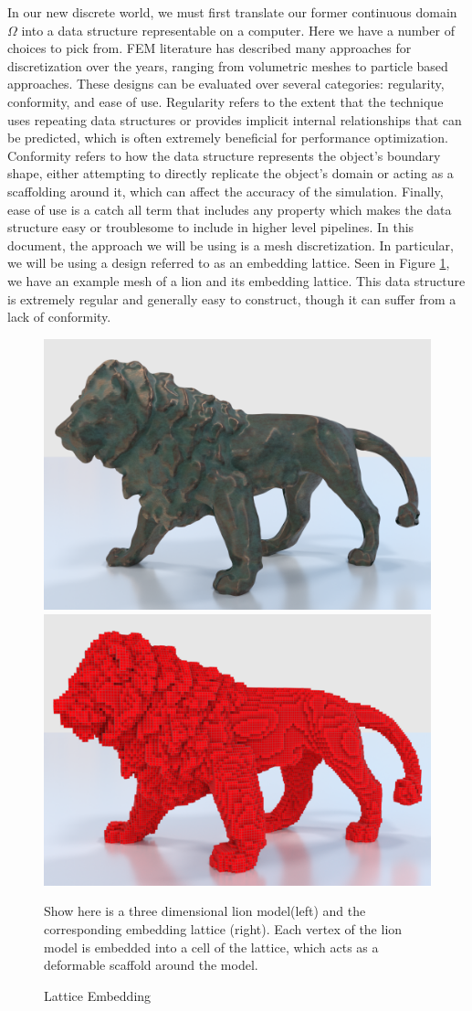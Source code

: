 In our new discrete world, we must first translate our former
continuous domain $\Omega$ into a data structure representable on a
computer. Here we have a number of choices to pick from. FEM
literature has described many approaches for discretization over the
years, ranging from volumetric meshes to particle based
approaches. These designs can be evaluated over several categories:
regularity, conformity, and ease of use. Regularity refers to the
extent that the technique uses repeating data structures or provides
implicit internal relationships that can be predicted, which is often
extremely beneficial for performance optimization. Conformity refers
to how the data structure represents the object's boundary shape,
either attempting to directly replicate the object's domain or acting
as a scaffolding around it, which can affect the accuracy of the
simulation. Finally, ease of use is a catch all term that includes any
property which makes the data structure easy or troublesome to include
in higher level pipelines. In this document, the approach we will be
using is a mesh discretization. In particular, we will be using a
design referred to as an embedding lattice. Seen in Figure
\ref{fig:embeddingexample}, we have an example mesh of a lion and its embedding lattice. This data structure is extremely regular
and generally easy to construct, though it can suffer from a lack of
conformity.

\begin{figure}[t]
  \includegraphics[width=.5\textwidth]{other_images/LionStatue.png}
  \includegraphics[width=.5\textwidth]{other_images/LionLattice.png}
   \caption{Lattice Embedding}{Show here is a three dimensional lion
     model\footnotemark (left) and the corresponding embedding lattice
     (right). Each vertex of the lion model is embedded into a cell of
   the lattice, which acts as a deformable scaffold around the model.}
   \label{fig:embeddingexample}
\end{figure}

